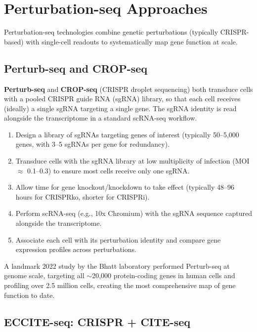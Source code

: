 \section{Perturbation-seq Approaches}
\label{sec:multiomics:perturbation}

Perturbation-seq technologies combine genetic perturbations (typically CRISPR-based) with single-cell readouts to systematically map gene function at scale.

\subsection{Perturb-seq and CROP-seq}
\label{subsec:multiomics:perturb-crop}

\textbf{Perturb-seq} and \textbf{CROP-seq} (CRISPR droplet sequencing) both transduce cells with a pooled CRISPR guide RNA (sgRNA) library, so that each cell receives (ideally) a single sgRNA targeting a single gene. The sgRNA identity is read alongside the transcriptome in a standard scRNA-seq workflow.

\begin{protocolbox}[title={Perturb-seq / CROP-seq Workflow}]
\begin{enumerate}[itemsep=2pt]
  \item Design a library of sgRNAs targeting genes of interest (typically 50--5,000 genes, with 3--5 sgRNAs per gene for redundancy).
  \item Transduce cells with the sgRNA library at low multiplicity of infection (MOI $\approx$ 0.1--0.3) to ensure most cells receive only one sgRNA.
  \item Allow time for gene knockout/knockdown to take effect (typically 48--96 hours for CRISPRko, shorter for CRISPRi).
  \item Perform scRNA-seq (e.g., 10x Chromium) with the sgRNA sequence captured alongside the transcriptome.
  \item Associate each cell with its perturbation identity and compare gene expression profiles across perturbations.
\end{enumerate}
\end{protocolbox}

A landmark 2022 study by the Bhatt laboratory performed Perturb-seq at genome scale, targeting all $\sim$20,000 protein-coding genes in human cells and profiling over 2.5 million cells, creating the most comprehensive map of gene function to date.

\subsection{ECCITE-seq: CRISPR + CITE-seq}
\label{subsec:multiomics:eccite}

